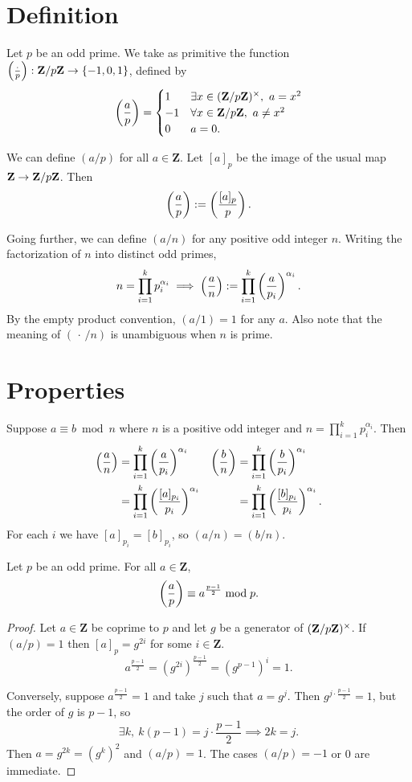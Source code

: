


\section{Definition}

Let $p$ be an odd prime. We take as primitive the function $\left(\frac{\cdot}{p}\right):\mathbf{Z}/p\mathbf{Z}\to\{-1,0,1\}$, defined by
\[\left(\frac{a}{p}\right)=
  \begin{cases}
    1&\exists x\in(\mathbf{Z}/p\mathbf{Z})^\times,\ a=x^2\\
    -1&\forall x\in\mathbf{Z}/p\mathbf{Z},\ a\neq x^2\\
    0&a=0.
  \end{cases}
\]

We can define $(a/p)$ for all $a\in\mathbf{Z}$. Let $[a]_{p}$ be the image of the usual map $\mathbf{Z}\to\mathbf{Z}/p\mathbf{Z}$. Then
\[\left(\frac{a}{p}\right):=\left(\frac{[a]_{p}}{p}\right).\]

Going further, we can define $(a/n)$ for any positive odd integer $n$. Writing the factorization of $n$ into distinct odd primes,
\[n=\prod_{i=1}^kp_i^{\alpha_i}\implies\left(\frac{a}{n}\right):=\prod_{i=1}^k\left(\frac{a}{p_i}\right)^{\alpha_i}.\]
By the empty product convention, $(a/1)=1$ for any $a$. Also note that the meaning of $(\,\cdot\,/n)$ is unambiguous when $n$ is prime.

\section{Properties}

Suppose $a\equiv b\bmod n$ where $n$ is a positive odd integer and $n=\prod_{i=1}^kp_i^{\alpha_i}$. Then
\begin{align*}
\left(\frac{a}{n}\right)&=\prod_{i=1}^k\left(\frac{a}{p_i}\right)^{\alpha_i}&\left(\frac{b}{n}\right)&=\prod_{i=1}^k\left(\frac{b}{p_i}\right)^{\alpha_i}\\
&=\prod_{i=1}^k\left(\frac{[a]_{p_i}}{p_i}\right)^{\alpha_i}&&=\prod_{i=1}^k\left(\frac{[b]_{p_i}}{p_i}\right)^{\alpha_i}.\\
\end{align*}
For each $i$ we have $[a]_{p_i}=[b]_{p_i}$, so $(a/n)=(b/n)$.

\begin{thm*}
Let $p$ be an odd prime. For all $a\in\mathbf{Z}$,
\[\left(\frac{a}{p}\right)\equiv a^\frac{p-1}{2}\bmod p.\]
\end{thm*}

\begin{proof}
Let $a\in\mathbf{Z}$ be coprime to $p$ and let $g$ be a generator of $(\mathbf{Z}/p\mathbf{Z})^\times$. If $(a/p) = 1$ then $[a]_p = g^{2i}$ for some $i\in\mathbf{Z}$.
\[a^\frac{p-1}{2} = (g^{2i})^\frac{p-1}{2} = (g^{p-1})^i = 1.\]

Conversely, suppose $a^\frac{p-1}{2} = 1$ and take $j$ such that $a = g^j$. Then $g^{j\cdot\frac{p-1}{2}} = 1$, but the order of $g$ is $p-1$, so
\[\exists k,\ k(p-1)=j\cdot\frac{p-1}{2}\implies 2k=j.\]
Then $a = g^{2k} = (g^k)^2$ and $(a/p) = 1$. The cases $(a/p) = -1$ or 0 are immediate.
\end{proof}


